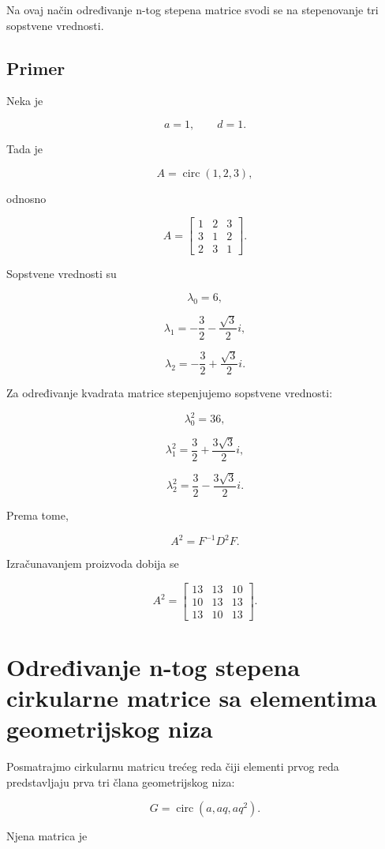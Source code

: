 \documentclass[12pt,a4paper]{report}
\begin{document}
Na ovaj način određivanje n-tog stepena matrice svodi se na stepenovanje tri sopstvene vrednosti.

\section{Primer}

Neka je

\[
a=1,\qquad d=1.
\]

Tada je

\[
A=\operatorname{circ}(1,2,3),
\]

odnosno

\[
A=
\begin{bmatrix}
	1 & 2 & 3\\
	3 & 1 & 2\\
	2 & 3 & 1
\end{bmatrix}.
\]

Sopstvene vrednosti su

\[
\lambda_0=6,
\]

\[
\lambda_1=-\frac32-\frac{\sqrt{3}}{2}i,
\]

\[
\lambda_2=-\frac32+\frac{\sqrt{3}}{2}i.
\]

Za određivanje kvadrata matrice stepenjujemo sopstvene vrednosti:

\[
\lambda_0^2=36,
\]

\[
\lambda_1^2=\frac32+\frac{3\sqrt{3}}{2}i,
\]

\[
\lambda_2^2=\frac32-\frac{3\sqrt{3}}{2}i.
\]

Prema tome,

\[
A^2=F^{-1}D^2F.
\]

Izračunavanjem proizvoda dobija se

\[
\boxed{
	A^2=
	\begin{bmatrix}
		13 & 13 & 10\\
		10 & 13 & 13\\
		13 & 10 & 13
	\end{bmatrix}
}.
\]

\chapter{Određivanje n-tog stepena cirkularne matrice sa elementima geometrijskog niza}

Posmatrajmo cirkularnu matricu trećeg reda čiji elementi prvog reda predstavljaju prva tri člana geometrijskog niza:

\[
G=\operatorname{circ}(a,aq,aq^2).
\]

Njena matrica je
\end{document}
